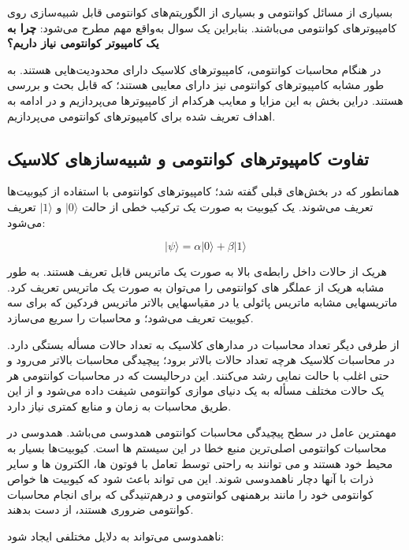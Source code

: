 \documentclass{book}
\begin{document}
بسیاری از مسائل کوانتومی و بسیاری از الگوریتم‌های کوانتومی قابل شبیه‌سازی روی کامپیوتر‌های کوانتومی می‌باشند. بنابراین یک سوال به‌واقع مهم مطرح می‌شود: \textbf{چرا به یک کامپیوتر کوانتومی نیاز داریم؟}

در هنگام محاسبات کوانتومی،‌ کامپیوتر‌های کلاسیک دارای محدودیت‌هایی هستند. به طور مشابه کامپیوتر‌های کوانتومی نیز دارای معایبی هستند؛ که قابل بحث و بررسی هستند. دراین بخش به این مزایا و معایب هرکدام از کامپیوترها می‌پردازیم و در ادامه به اهداف تعریف شده برای کامپیوترهای کوانتومی می‌پردازیم.


\subsection{تفاوت کامپیوترهای کوانتومی و شبیه‌سازهای کلاسیک}
همانطور که در بخش‌های قبلی گفته شد؛ کامپیوترهای کوانتومی با استفاده از کیوبیت‌ها تعریف می‌شوند. یک کیوبیت به صورت یک ترکیب خطی از حالت $\vert0\rangle$ و $\vert1\rangle$ تعریف می‌شود:

\begin{center}
\begin{equation}
\vert\psi\rangle = \alpha\vert0\rangle + \beta\vert1\rangle
\end{equation}
\end{center}

هریک از حالات داخل رابطه‌ی بالا به صورت یک ماتریس قابل تعریف هستند. به طور مشابه هریک از عملگر های کوانتومی را می‌توان به صورت یک ماتریس تعریف کرد. ماتریسهایی مشابه ماتریس پائولی یا در مقیاسهایی بالاتر ماتریس فردکین که برای سه کیوبیت تعریف می‌شود؛ و محاسبات را سریع می‌سازد.



از طرفی دیگر تعداد محاسبات در مدار‌های کلاسیک به تعداد حالات مسأ‌له بستگی دارد. در محاسبات کلاسیک هرچه تعداد حالات بالاتر برود؛ پیچیدگی محاسبات بالاتر می‌رود و حتی اغلب با حالت نمایی رشد می‌کنند. این درحالیست که در محاسبات کوانتومی هر یک حالات مختلف مسأ‌له به یک دنیای موازی کوانتومی شیفت داده می‌شود و از این طریق محاسبات به زمان و منابع کمتری نیاز دارد.


مهمترین عامل در سطح پیچیدگی محاسبات کوانتومی همدوسی می‌باشد. 
همدوسی در محاسبات کوانتومی اصلی‌ترین منبع خطا در این سیستم ها است. کیوبیت‌ها بسیار به محیط خود هستند و می توانند به راحتی توسط  تعامل با فوتون ها، الکترون ها و سایر ذرات با آنها دچار ناهمدوسی شوند. این می تواند باعث شود که کیوبیت ها خواص کوانتومی خود را مانند برهمنهی کوانتومی و درهم‌تنیدگی که برای انجام محاسبات کوانتومی ضروری هستند، از دست بدهند.

ناهمدوسی می‌تواند به دلایل مختلفی ایجاد شود:
\end{document}
